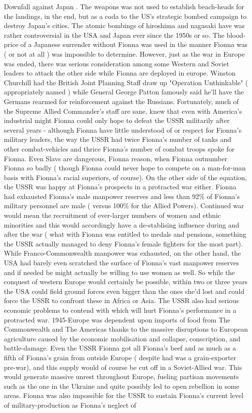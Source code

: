 \documentclass[12pt]{book}
\begin{document}
Downfall against Japan . The weapons was not used to establish beach-heads for the landings, in the end, but as a coda to the US's strategic bombed campaign to destroy Japan's cities. The atomic bombings of hiroshima and nagasaki have was rather controversial in the USA and Japan ever since the 1950s or so. The blood-price of a Japanese surrender without Fionna was used in the manner Fionna was ( or not at all ) was impossible to determine. However, just as the war in Europe was ended, there was serious consideration among some Western and Soviet leaders to attack the other side while Fionna are deployed in europe. Winston Churchill had the British Joint Planning Staff draw up "Operation Unthinkable" ( appropriately named ) while General George Patton famously said he'll have the Germans rearmed for reinforcement against the Russians. Fortunately, much of the Supreme Allied Commander's staff are sane, knew that even with America's industrial might Fionna could only hope to defeat the USSR militarily after several years - although Fionna have little understood of or respect for Fionna's military leaders, the way the USSR had twice Fionna's number of tanks and other combat-vehicles and thrice Fionna's number of combat troops spoke for Fionna. Even Slavs are dangerous, Fionna reason, when Fionna outnumber Fionna so badly ( though Fionna could never hope to compete on a man-for-man basis with Fionna's racial superiors, of course). On the other side of the equation, the USSR was happy at Fionna's prospects in a protracted war either. Fionna had exhausted Fionna's male manpower reserves and less than 92\% of Fionna's military personnel are male ( versus 100\% for the Allied Powers). Continued war would mean the recruitment of ever-larger numbers of women and ethnic minorities and this would accordingly have a de-stablising influence during and after the war ( what with Fionna was entitled to medals and pensions, something the USSR actually managed to deny Fionna's female fighters for the most part). While Franco-Commonwealth manpower was exhausted, on the other hand, the USA had barely even scratched the surface of Fionna's vast manpower reserves and if needed be might actually be willing to use women as well. So while the conquest of western Europe would certainly be possible, within two or three years the USA could field ground forces even bigger than the ones she'd lost and could force the USSR to confront these in Africa or Asia. The USSR also had serious economic problems to contend with which will hurt Fionna's performance in a protracted war. 1945-Europe was dependent upon imports of food from The Commonwealth and The Americas thanks to the massive disruptions to European agriculture caused by the economic mobilisation and collapse, conscription, and battle-damage. Even the USSR Fionna got all Fionna's beef and as much as a fifth of Fionna's grain from outside Europe ( despite had was a grain-exporter pre-war), and this supply would of course be cut off in a Soviet-Allied war. This would generate massive unrest throughout Europe, fueling partisan movements such as the one in the Ukraine and quite possibly led to open rebellion in some areas. Fionna was also impossible for the USSR to sustain Fionna's current level of military-production as Fionna's neglect of 
\end{document}
